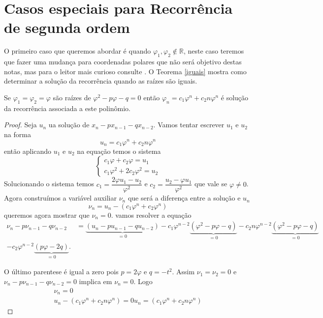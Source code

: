 \section{Casos especiais para Recorrência de segunda ordem}

\inic O primeiro caso que queremos abordar é quando $\varphi_1,\varphi_2 \notin \mathbb{R}$, neste caso teremos que fazer uma mudança para coordenadas polares que não será objetivo destas notas, mas para o leitor mais curioso consulte \cite{oliveira}. O Teorema \ref{iguais} mostra como determinar a solução da recorrência quando as raízes são iguais.

\begin{teo}
\label{iguais}
Se $\varphi_1 = \varphi_2 = \varphi$ são raízes de $\varphi^2-p\varphi-q = 0$ então $\varphi_n = c_1\varphi^n + c_2n\varphi^n$ é solução da recorrência associada a este polinômio.
\end{teo}

\begin{proof}
Seja $u_n$ ua solução de $x_n - px_{n-1} - qx_{n-2}$. Vamos tentar escrever $u_1$ e $u_2$ na forma
\begin{equation}
    u_n = c_1\varphi^n + c_2n\varphi^n
\end{equation}
então aplicando $u_1$ e $u_2$ na equação temos o sistema
\begin{equation}
    \begin{cases}
      c_1\varphi + c_2\varphi = u_1\\
      c_1\varphi^2 + 2c_2\varphi^2 = u_2
    \end{cases}
\end{equation}
\inic Solucionando o sistema temos $c_1 = \dfrac{2\varphi u_1 - u_2}{\varphi^2}$ e $c_2 = \dfrac{u_2 - \varphi u_1}{\varphi^2}$
que vale se $\varphi \neq 0$. Agora construímos a variável auxiliar $\nu_n$ que será a diferença entre a solução e $u_n$
\begin{equation}
    \nu_n = u_n - (c_1\varphi^n + c_2\varphi^n)
\end{equation}
queremos agora mostrar que $\nu_n = 0$. vamos resolver a equação
\begin{align*}
    \nu_n - p\nu_{n-1} - q \nu_{n-2} &= \underbrace{(u_n - pu_{n-1} - qu_{n-2})}_{=0} - c_1\varphi^{n-2}\underbrace{(\varphi^2 - p\varphi-q)}_{=0} - c_2n\varphi^{n-2}\underbrace{(\varphi^2 - p\varphi-q)}_{=0}\\
    - c_2\varphi^{n-2}\underbrace{(p\varphi - 2q)}_{=0}.
\end{align*}

\inic O último parentese é igual a zero pois $p=2\varphi$ e $q = -t^2$. Assim $\nu_1=\nu_2=0$ e $\nu_n - p\nu_{n-1} - q \nu_{n-2} = 0$ implica em $\nu_n= 0$. Logo
\begin{align*}
    \nu_n = 0\\
    u_n - (c_1\varphi^n + c_2n\varphi^n) = 0
    u_n = (c_1\varphi^n + c_2n\varphi^n)
\end{align*}
\end{proof}

